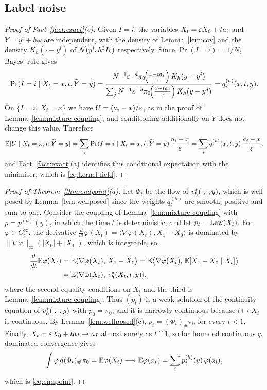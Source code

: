 \documentclass{article} %
\makeatletter
\newif\ificlr
\newcommand{\placeblock}[1]{\ificlr\@nameuse{moved@#1}\fi}
\newcommand{\iclrbr}{\\&}\newcommand{\iclrbrq}{\\&\qquad}\newcommand{\iclrqbr}{\\&}
\newcommand{\iclrbr}{}\newcommand{\iclrbrq}{}\newcommand{\iclrqbr}{\qquad}
\theoremstyle{plain}
\theoremstyle{definition}
\theoremstyle{remark}
\makeatother
\begin{document}
\subsection{Label noise}
\label{apx:pf-kernel}

\label{apx:pf-kernel-field}
\begin{proof}[Proof of Fact~\ref{fact:exact}(c)]
Given $I=i$, the variables $X_t=\varepsilon X_0+ta_i$ and $\widetilde Y=y^i+h\omega$ are independent, with
the density of Lemma~\ref{lem:cov} and the density $K_h(\cdot-y^i)$ of $\mathcal{N}(y^i,h^2I_k)$
respectively. Since $\Pr(I=i)=1/N$, Bayes' rule gives
\[
\Pr(I=i\mid X_t=x,t,\widetilde Y=y)
=\frac{N^{-1}\varepsilon^{-d}\pi_0\!\Big(\frac{x-ta_{i}}{\varepsilon}\Big)\,K_h(y-y^{i})}{\sum_jN^{-1}\varepsilon^{-d}\pi_0\!\Big(\frac{x-ta_{j}}{\varepsilon}\Big)\,K_h(y-y^{j})}
=q^{(h)}_i(x,t,y).
\]
On $\{I=i,\ X_t=x\}$ we have $U=(a_i-x)/\varepsilon$, as in the proof of
Lemma~\ref{lem:mixture-coupling}, and conditioning additionally on $\widetilde Y$ does not change
this value. Therefore
\[
\mathbb{E}[U\mid X_t=x,t,\widetilde Y=y]
=\sum_i\Pr(I=i\mid X_t=x,t,\widetilde Y=y)\,\frac{a_i-x}{\varepsilon}
=\sum_iq^{(h)}_i(x,t,y)\,\frac{a_i-x}{\varepsilon},
\]
and Fact~\ref{fact:exact}(a) identifies this conditional expectation with the minimiser,
which is \eqref{eq:kernel-field}.
\end{proof}
\placeblock{coupling}

\label{apx:pf-endpoint}
\thmendpoint*
\begin{proof}[Proof of Theorem~\ref{thm:endpoint}(a)]
Let $\Phi_t$ be the flow of $v_h^\star(\cdot,\cdot,y)$, which is well posed by
Lemma~\ref{lem:wellposed} since the weights $q^{(h)}_i$ are smooth, positive and sum to one.
Consider the coupling of Lemma~\ref{lem:mixture-coupling} with $p=p^{(h)}(y)$, in which the time
$t$ is deterministic, and let $p_t=\mathrm{Law}(X_t)$. For $\varphi\in C_c^\infty$, the derivative
$\frac{d}{dt}\varphi(X_t)=\langle\nabla\varphi(X_t),X_1-X_0\rangle$ is dominated by
$\|\nabla\varphi\|_\infty(|X_0|+|X_1|)$, which is integrable, so
\begin{align*}
\frac{d}{dt}\E\varphi(X_t)
&=\E\langle\nabla\varphi(X_t),\,X_1-X_0\rangle
=\E\bigl\langle\nabla\varphi(X_t),\,\E[X_1-X_0\mid X_t]\bigr\rangle
\iclrbr=\E\langle\nabla\varphi(X_t),\,\vstar(X_t,t,y)\rangle ,
\end{align*}
where the second equality conditions on $X_t$ and the third is Lemma~\ref{lem:mixture-coupling}.
Thus $(p_t)$ is a weak solution of the continuity equation of $v_h^\star(\cdot,\cdot,y)$ with
$p_0=\pi_0$, and it is narrowly continuous because $t\mapsto X_t$ is continuous. By
Lemma~\ref{lem:wellposed}(c), $p_t=(\Phi_t)_\#\pi_0$ for every $t<1$. Finally,
$X_t=\varepsilon X_0+ta_I\to a_I$ almost surely as $t\uparrow1$, so for bounded continuous $\varphi$
dominated convergence gives
\[
\int\varphi\,d(\Phi_t)_\#\pi_0=\mathbb{E}\varphi(X_t)\longrightarrow\mathbb{E}\varphi(a_I)
=\sum_ip_i^{(h)}(y)\,\varphi(a_i),
\]
which is \eqref{eq:endpoint}.
\end{proof}
\end{document}

